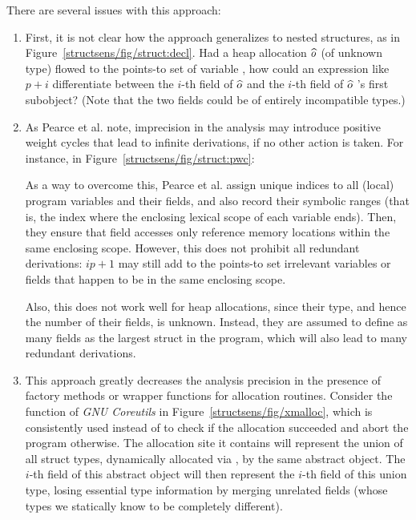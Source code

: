 There are several issues with this approach:
\begin{enumerate}
\item First, it is not clear how the approach generalizes to nested structures,
  as in Figure~\ref{structsens/fig/struct:decl}. Had a heap allocation
  $\widehat{o}$ (of unknown type) flowed to the points-to set of
  variable , how could an expression like $p + i$
  differentiate between the $i$-th field of $\widehat{o}$ and the $i$-th
  field of $\widehat{o}$ 's first subobject? (Note that the two fields
  could be of entirely incompatible types.)
\item As Pearce et al. note, imprecision in the analysis may introduce
  positive weight cycles that lead to infinite derivations, if no
  other action is taken. For instance, in
  Figure~\ref{structsens/fig/struct:pwc}:
  As a way to overcome this, Pearce et al. assign unique indices to all
  (local) program variables and their fields, and also record their symbolic
  ranges (that is, the index where the enclosing lexical scope of each
  variable ends). Then, they ensure that field accesses only reference
  memory locations within the same enclosing scope. However, this does
  not prohibit all redundant derivations: $ip + 1$ may still add to
  the points-to set irrelevant variables or fields that happen to be
  in the same enclosing scope.

  Also, this does not work well for heap allocations, since their
  type, and hence the number of their fields, is unknown. Instead, they
  are assumed to define as many fields as the largest struct in the
  program, which will also lead to many redundant derivations.
\item This approach greatly decreases the analysis precision in the
  presence of factory methods or wrapper functions for allocation
  routines. Consider the  function of \emph{GNU
    Coreutils} in Figure~\ref{structsens/fig/xmalloc}, which is
  consistently used instead of  to check if the
  allocation succeeded and abort the program otherwise. The allocation
  site it contains will represent the union of all struct types,
  dynamically allocated via , by the same abstract
  object. The $i$-th field of this abstract object will then represent
  the $i$-th field of this union type, losing essential type
  information by merging unrelated fields (whose types we statically
  know to be completely different).
\end{enumerate}

